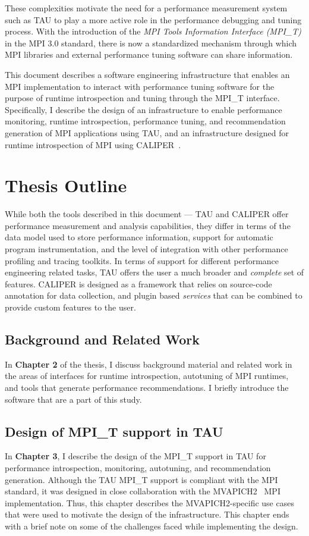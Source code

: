 These complexities motivate the need for a performance measurement system such as TAU to play a more active role in the performance debugging and tuning process. With the introduction of the \textit{MPI Tools Information Interface (MPI\_T)} in the MPI 3.0 standard, there is now a standardized mechanism through which MPI libraries and external performance tuning software can share information. 
\par This document describes a software engineering infrastructure that enables an MPI implementation to interact with performance tuning software for the purpose of runtime introspection and tuning through the MPI\_T interface. Specifically, I describe the design of an infrastructure to enable performance monitoring, runtime introspection, performance tuning, and recommendation generation of MPI applications using TAU, and an infrastructure designed for runtime introspection of MPI using CALIPER~\cite{CALIPER}.

\section {Thesis Outline}
While both the tools described in this document --- TAU and CALIPER offer performance measurement and analysis capabilities, they differ in terms of the data model used to store performance information, support for automatic program instrumentation, and the level of integration with other performance profiling and tracing toolkits. In terms of support for different performance engineering related tasks, TAU offers the user a much broader and \textit{complete} set of features. CALIPER is designed as a framework that relies on source-code annotation for data collection, and plugin based \textit{services} that can be combined to provide custom features to the user.

\subsection {Background and Related Work}
In \textbf{Chapter 2} of the thesis, I discuss background material and related work in the areas of interfaces for runtime introspection, autotuning of MPI runtimes, and tools that generate performance recommendations. I briefly introduce the  software that are a part of this study.

\subsection {Design of MPI\_T support in TAU}
In \textbf{Chapter 3}, I describe the design of the MPI\_T support in TAU for performance introspection, monitoring, autotuning, and recommendation generation. Although the TAU MPI\_T support is compliant with the MPI standard, it was designed in close collaboration with the MVAPICH2~\cite{MVAPICH2} MPI implementation. Thus, this chapter describes the MVAPICH2-specific use cases that were used to motivate the design of the infrastructure. This chapter ends with a brief note on some of the challenges faced while implementing the design.

